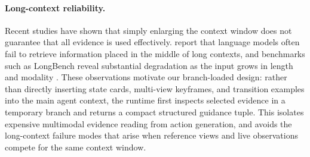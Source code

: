 \paragraph{Long-context reliability.}
Recent studies have shown that simply enlarging the context window does not guarantee that all evidence is used effectively. \citet{liu2023lostmiddlelanguagemodels} report that language models often fail to retrieve information placed in the middle of long contexts, and benchmarks such as LongBench reveal substantial degradation as the input grows in length and modality \citep{bai2024longbenchbilingualmultitaskbenchmark}. These observations motivate our branch-loaded design: rather than directly inserting state cards, multi-view keyframes, and transition examples into the main agent context, the runtime first inspects selected evidence in a temporary branch and returns a compact structured guidance tuple. This isolates expensive multimodal evidence reading from action generation, and avoids the long-context failure modes that arise when reference views and live observations compete for the same context window.
